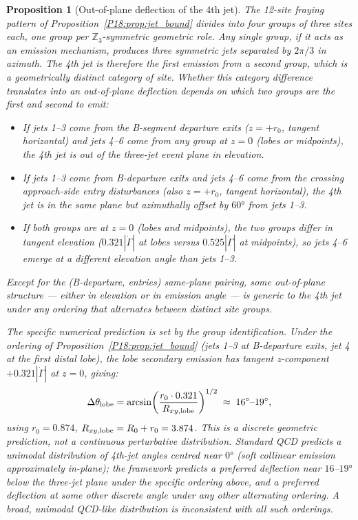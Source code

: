 \documentclass[11pt,a4paper]{article}
\newtheorem{proposition}[theorem]{Proposition}
\theoremstyle{definition}\newtheorem{definition}[theorem]{Definition}
\theoremstyle{remark}
\newcommand{\Zthree}{\mathbb{Z}_3}
\begin{document}
\begin{proposition}[Out-of-plane deflection of the 4th jet]
\label{P18:prop:fourjet_oop}
The 12-site fraying pattern of Proposition~\ref{P18:prop:jet_bound}
divides into four groups of three sites each, one group per
$\Zthree$-symmetric geometric role.  Any single group, if it acts
as an emission mechanism, produces three symmetric jets separated
by $2\pi/3$ in azimuth.  The 4th jet is therefore the \emph{first
emission from a second group}, which is a geometrically distinct
category of site.  Whether this category difference translates into
an out-of-plane deflection depends on which two groups are the
first and second to emit:

\begin{itemize}[noitemsep]
\item If jets 1--3 come from the B-segment departure exits
  ($z=+r_0$, tangent horizontal) and jets 4--6 come from any group
  at $z=0$ (lobes or midpoints), the 4th jet is out of the
  three-jet event plane in elevation.
\item If jets 1--3 come from B-departure exits and jets 4--6 come
  from the crossing approach-side entry disturbances (also
  $z=+r_0$, tangent horizontal), the 4th jet is in the same plane
  but azimuthally offset by $60°$ from jets 1--3.
\item If both groups are at $z=0$ (lobes and midpoints), the two
  groups differ in tangent elevation ($0.321|\dot\Gamma|$ at lobes
  versus $0.525|\dot\Gamma|$ at midpoints), so jets 4--6 emerge at
  a different elevation angle than jets 1--3.
\end{itemize}

Except for the (B-departure, entries) same-plane pairing, some
out-of-plane structure --- either in elevation or in emission
angle --- is generic to the 4th jet under any ordering that
alternates between distinct site groups.

The specific numerical prediction is set by the group identification.
Under the ordering of Proposition~\ref{P18:prop:jet_bound} (jets 1--3
at B-departure exits, jet 4 at the first distal lobe), the lobe
secondary emission has tangent z-component $+0.321|\dot\Gamma|$ at
$z=0$, giving:
\begin{equation}
  \Delta\theta_{\rm lobe}
  = \arcsin\!\left(\frac{r_0\cdot0.321}{R_{xy,\rm lobe}}\right)^{1/2}
  \;\approx\; 16^\circ\text{--}19^\circ,
  \label{P18:eq:lobe_angle}
\end{equation}
using $r_0=0.874$, $R_{xy,\rm lobe}=R_0+r_0=3.874$.
This is a discrete geometric prediction, not a
continuous perturbative distribution.  Standard QCD predicts
a unimodal distribution of 4th-jet angles centred near $0°$
(soft collinear emission approximately in-plane); the framework
predicts a preferred deflection near $16$--$19°$ below the
three-jet plane under the specific ordering above, and a
preferred deflection at some other discrete angle under any other
alternating ordering.  A broad, unimodal QCD-like distribution is
inconsistent with all such orderings.
\end{proposition}
\end{document}
